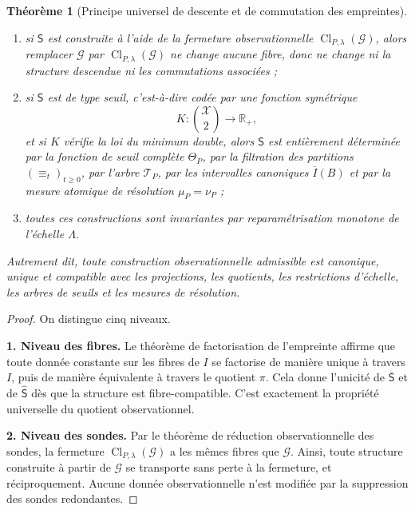 \documentclass[11pt,a4paper]{article}
\newtheorem{theorem}{Théorème}
\begin{document}
\begin{appendices}
\begin{theorem}[Principe universel de descente et de commutation des empreintes]
\begin{enumerate}[label=\textbf{(\alph*)}]
\item si \(\mathsf S\) est construite à l'aide de la fermeture observationnelle \(\operatorname{Cl}_{P,\lambda}(\mathcal G)\), alors remplacer \(\mathcal G\) par \(\operatorname{Cl}_{P,\lambda}(\mathcal G)\) ne change aucune fibre, donc ne change ni la structure descendue ni les commutations associées ;

\item si \(\mathsf S\) est de type seuil, c'est-à-dire codée par une fonction symétrique
\[
K:\binom{\mathcal X}{2}\to\mathbb R_+,
\]
et si \(K\) vérifie la loi du minimum double, alors \(\mathsf S\) est entièrement déterminée par la fonction de seuil complète \(\Theta_P\), par la filtration des partitions \((\equiv_t)_{t\ge 0}\), par l'arbre \(\mathcal T_P\), par les intervalles canoniques \(\overline I(B)\) et par la mesure atomique de résolution \(\mu_P=\nu_P\) ;

\item toutes ces constructions sont invariantes par reparamétrisation monotone de l'échelle \(\Lambda\).
\end{enumerate}

Autrement dit, toute construction observationnelle admissible est canonique, unique et compatible avec les projections, les quotients, les restrictions d'échelle, les arbres de seuils et les mesures de résolution.
\end{theorem}

\begin{proof}
On distingue cinq niveaux.

\medskip
\noindent\textbf{1. Niveau des fibres.}
Le théorème de factorisation de l'empreinte affirme que toute donnée constante sur les fibres de \(I\) se factorise de manière unique à travers \(I\), puis de manière équivalente à travers le quotient \(\pi\). Cela donne l'unicité de \(\overline{\mathsf S}\) et de \(\widehat{\mathsf S}\) dès que la structure est fibre-compatible. C'est exactement la propriété universelle du quotient observationnel.

\medskip
\noindent\textbf{2. Niveau des sondes.}
Par le théorème de réduction observationnelle des sondes, la fermeture \(\operatorname{Cl}_{P,\lambda}(\mathcal G)\) a les mêmes fibres que \(\mathcal G\). Ainsi, toute structure construite à partir de \(\mathcal G\) se transporte sans perte à la fermeture, et réciproquement. Aucune donnée observationnelle n'est modifiée par la suppression des sondes redondantes.


\end{proof}
\end{appendices}
\end{document}
